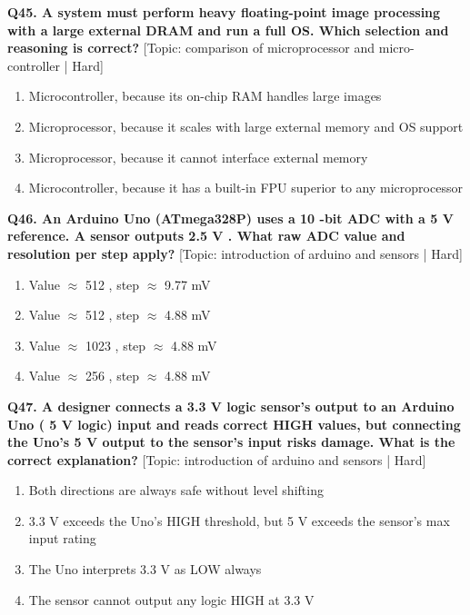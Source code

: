 \noindent\textbf{Q45. A system must perform heavy floating-point image processing with a large external DRAM and run a full OS. Which selection and reasoning is correct?} \hfill [Topic: comparison of microprocessor and micro-controller | Hard]
\begin{enumerate}[label=(\alph*),topsep=2pt,itemsep=1pt,partopsep=0pt,parsep=0pt]
    \item {Microcontroller, because its on-chip RAM handles large images}
    \item {Microprocessor, because it scales with large external memory and OS support}
    \item {Microprocessor, because it cannot interface external memory}
    \item {Microcontroller, because it has a built-in FPU superior to any microprocessor}
\end{enumerate}
\vspace{2mm}

\noindent\textbf{Q46. An Arduino Uno (ATmega328P) uses a 10 -bit ADC with a 5 V reference. A sensor outputs 2.5 V . What raw ADC value and resolution per step apply?} \hfill [Topic: introduction of arduino and sensors | Hard]
\begin{enumerate}[label=(\alph*),topsep=2pt,itemsep=1pt,partopsep=0pt,parsep=0pt]
    \item {Value $\approx$ 512 , step $\approx$ 9.77 mV}
    \item {Value $\approx$ 512 , step $\approx$ 4.88 mV}
    \item {Value $\approx$ 1023 , step $\approx$ 4.88 mV}
    \item {Value $\approx$ 256 , step $\approx$ 4.88 mV}
\end{enumerate}
\vspace{2mm}

\noindent\textbf{Q47. A designer connects a 3.3 V logic sensor's output to an Arduino Uno ( 5 V logic) input and reads correct HIGH values, but connecting the Uno's 5 V output to the sensor's input risks damage. What is the correct explanation?} \hfill [Topic: introduction of arduino and sensors | Hard]
\begin{enumerate}[label=(\alph*),topsep=2pt,itemsep=1pt,partopsep=0pt,parsep=0pt]
    \item {Both directions are always safe without level shifting}
    \item {3.3 V exceeds the Uno's HIGH threshold, but 5 V exceeds the sensor's max input rating}
    \item {The Uno interprets 3.3 V as LOW always}
    \item {The sensor cannot output any logic HIGH at 3.3 V}
\end{enumerate}
\vspace{2mm}

